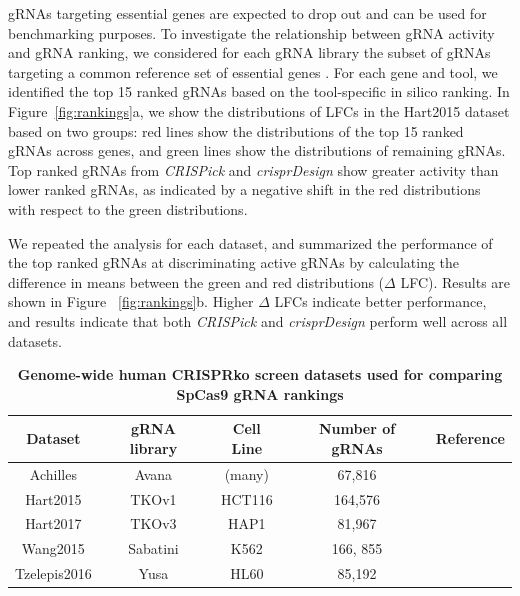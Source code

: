 \documentclass[pdftex,english,10pt]{article}
\begin{document}
gRNAs targeting essential genes are expected to drop out and can be used for benchmarking purposes. 
To investigate the relationship between gRNA activity and gRNA ranking, we considered for each gRNA library the subset of gRNAs targeting a common reference set of essential genes \citep{hart2014}. For each gene and tool, we identified the top 15 ranked gRNAs based on the tool-specific in silico ranking. In Figure~\ref{fig:rankings}a, we show the distributions of LFCs in the Hart2015 dataset based on two groups: red lines show the distributions of the top 15 ranked gRNAs across genes, and green lines show the distributions of remaining gRNAs. Top ranked gRNAs from \textit{CRISPick} and \textit{crisprDesign} show greater activity than lower ranked gRNAs, as indicated by a negative shift in the red distributions with respect to the green distributions. 

We repeated the analysis for each dataset, and summarized the performance of the top ranked gRNAs at discriminating active gRNAs by calculating the difference in means between the green and red distributions ($\Delta$ LFC). Results are shown in Figure ~\ref{fig:rankings}b. Higher $\Delta$ LFCs indicate better performance, and results indicate that both \textit{CRISPick} and \textit{crisprDesign} perform well across all datasets.


\begin{table}[]
\centering 
\begin{tabular}{c|c|c|c|c}
Dataset   & gRNA library  & Cell Line & Number of gRNAs  & Reference \\ \hline
Achilles  & Avana   & (many)   & 67,816  &       \citet{ceres}    \\
Hart2015 & TKOv1  &  HCT116     & 164,576 &         \citet{toronto1}       \\
Hart2017 & TKOv3    & HAP1        & 81,967 &     \citet{toronto3}         \\
Wang2015 & Sabatini & K562      &166, 855 &          \citet{sabatini}     \\
Tzelepis2016  &     Yusa     &  HL60     &   85,192 &         \citet{yusa}  
\end{tabular}
\caption{\textbf{Genome-wide human CRISPRko screen datasets used for comparing SpCas9 gRNA rankings}}
\label{tab:screens}
\end{table}
\end{document}
